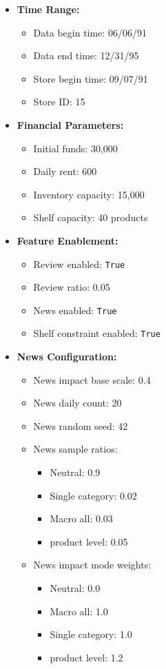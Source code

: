 \begin{itemize}
    \item \textbf{Time Range:}
    \begin{itemize}
        \item Data begin time: 06/06/91
        \item Data end time: 12/31/95
        \item Store begin time: 09/07/91
        \item Store ID: 15
    \end{itemize}
    
    \item \textbf{Financial Parameters:}
    \begin{itemize}
        \item Initial funds: 30,000
        \item Daily rent: 600
        \item Inventory capacity: 15,000
        \item Shelf capacity: 40 products
    \end{itemize}
    
    \item \textbf{Feature Enablement:}
    \begin{itemize}
        \item Review enabled: \texttt{True}
        \item Review ratio: 0.05
        \item News enabled: \texttt{True}
        \item Shelf constraint enabled: \texttt{True}
    \end{itemize}
    
    \item \textbf{News Configuration:}
    \begin{itemize}
        \item News impact base scale: 0.4
        \item News daily count: 20
        \item News random seed: 42
        \item News sample ratios:
        \begin{itemize}
            \item Neutral: 0.9
            \item Single category: 0.02
            \item Macro all: 0.03
            \item product level: 0.05
        \end{itemize}
        \item News impact mode weights:
        \begin{itemize}
            \item Neutral: 0.0
            \item Macro all: 1.0
            \item Single category: 1.0
            \item product level: 1.2
        \end{itemize}
    \end{itemize}
    

\end{itemize}
